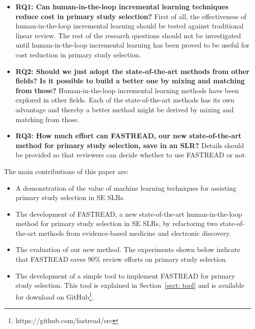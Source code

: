\documentclass[final,twocolumn,5p]{elsarticle}
\theoremstyle{break}
\begin{document}
\begin{itemize}


\item
{\bf RQ1: Can human-in-the-loop incremental learning techniques reduce cost in primary study selection?} First of all, the effectiveness of human-in-the-loop incremental learning should be tested against traditional linear review. The rest of the research questions should not be investigated until human-in-the-loop incremental learning has been proved to be useful for cost reduction in primary study selection.

\item
{\bf RQ2: Should we just adopt the state-of-the-art methods from other fields? Is it possible to build a better one by mixing and matching from those?} Human-in-the-loop incremental learning methods have been explored in other fields. Each of the state-of-the-art methods has its own advantage and thereby a better method might be derived by mixing and matching from those. 

\item
{\bf RQ3: How much effort can FASTREAD, our new state-of-the-art method for primary study selection, save in an SLR?} Details should be provided so that reviewers can decide whether to use FASTREAD or not.


\end{itemize}
The main contributions of this paper are:
\begin{itemize}
\item
  A demonstration of the value of  machine learning techniques for assisting primary study selection in SE SLRs.
\item
  The development of FASTREAD, a new state-of-the-art human-in-the-loop method for primary study selection in SE SLRs, by refactoring two state-of-the-art methods
  from evidence-based medicine and electronic discovery.
  
\item
  The evaluation of our new method.
  The experiments shown below indicate that FASTREAD
  saves 90\% review efforts on primary study selection.
\item The development of a simple tool to implement FASTREAD for primary study selection.
  This tool is explained in Section~\ref{sect: tool} and is
  available for download on GitHub\footnote{https://github.com/fastread/src}. 
\end{itemize}
\end{document}
